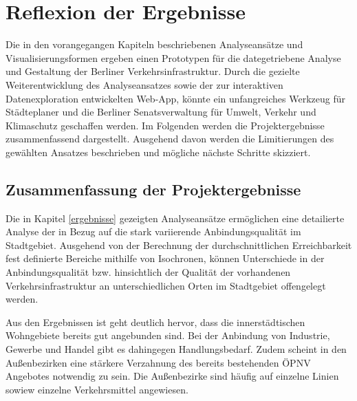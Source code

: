 \newpage
\section{Reflexion der Ergebnisse} \label{fazit}
Die in den vorangegangen Kapiteln beschriebenen Analyseansätze und Visualisierungsformen ergeben einen Prototypen für die dategetriebene Analyse und Gestaltung der Berliner Verkehrsinfrastruktur. Durch die gezielte Weiterentwicklung des Analyseansatzes sowie der zur interaktiven Datenexploration entwickelten Web-App, könnte ein unfangreiches Werkzeug für Städteplaner und die Berliner Senatsverwaltung für Umwelt, Verkehr und Klimaschutz geschaffen werden. Im Folgenden werden die Projektergebnisse zusammenfassend dargestellt. Ausgehend davon werden die Limitierungen des gewählten Ansatzes beschrieben und mögliche nächste Schritte skizziert.

\subsection{Zusammenfassung der Projektergebnisse}
Die in Kapitel \ref{ergebnisse} gezeigten Analyseansätze ermöglichen eine detailierte Analyse der in Bezug auf die stark variierende Anbindungsqualität im Stadtgebiet. Ausgehend von der Berechnung der durchschnittlichen Erreichbarkeit fest definierte Bereiche mithilfe von Isochronen, können Unterschiede in der Anbindungsqualität bzw. hinsichtlich der Qualität der vorhandenen Verkehrsinfrastruktur an unterschiedlichen Orten im Stadtgebiet offengelegt werden.

Aus den Ergebnissen ist geht deutlich hervor, dass die innerstädtischen Wohngebiete bereits gut angebunden sind. Bei der Anbindung von Industrie, Gewerbe und Handel gibt es dahingegen Handlungsbedarf. Zudem scheint in den Außenbezirken eine stärkere Verzahnung des bereits bestehenden ÖPNV Angebotes notwendig zu sein. Die Außenbezirke sind häufig auf einzelne Linien sowiew einzelne Verkehrsmittel angewiesen.



